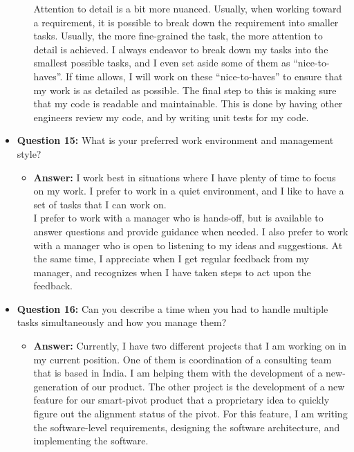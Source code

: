 \documentclass{article}
\begin{document}
\begin{itemize}
\begin{itemize}
        Attention to detail is a bit more nuanced. Usually, when working toward a requirement,
        it is possible to break down the requirement into smaller tasks. Usually, the more
        fine-grained the task, the more attention to detail is achieved. I always endeavor
        to break down my tasks into the smallest possible tasks, and I even set aside
        some of them as ``nice-to-haves''. If time allows, I will work on these ``nice-to-haves''
        to ensure that my work is as detailed as possible. The final step to
        this is making sure that my code is readable and maintainable. This is done by
        having other engineers review my code, and by writing unit tests for my code.
    \end{itemize}
    
    \item \textbf{Question 15:} What is your preferred work environment and management style?
    \begin{itemize}
        \item \textbf{Answer:} I work best in situations where I have plenty of time to focus
        on my work. I prefer to work in a quiet environment, and I like to have
        a set of tasks that I can work on.\\

        I prefer to work with a manager who is hands-off, but is available to
        answer questions and provide guidance when needed. I also prefer to
        work with a manager who is open to listening to my ideas and suggestions. At the same
        time, I appreciate when I get regular feedback from my manager, and
        recognizes when I have taken steps to act upon the feedback.\\
    \end{itemize}
    
    \item \textbf{Question 16:} Can you describe a time when you had to handle multiple tasks simultaneously and how you manage them?
    \begin{itemize}
        \item \textbf{Answer:} Currently, I have two different projects that I am working on in my
        current position. One of them is coordination of a consulting team that is
        based in India. I am helping them with the development of a new-generation of
        our product. The other project is the development of a new feature for our
        smart-pivot product that a proprietary idea to quickly figure out the alignment
        status of the pivot. For this feature, I am writing the software-level requirements,
        designing the software architecture, and implementing the software.\\


\end{itemize}
\end{itemize}
\end{document}
